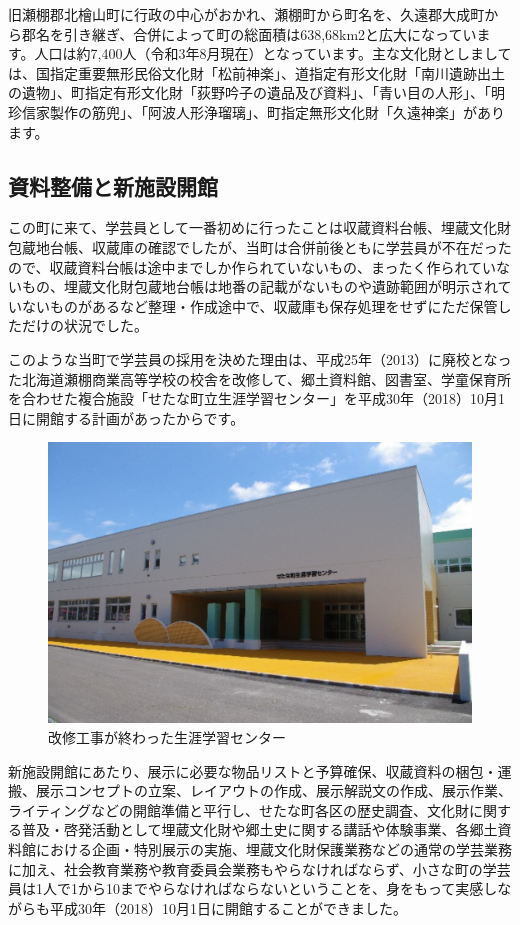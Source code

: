 \documentclass[a4j,11pt,twocolumn,openany]{jsbook}
\begin{document}
旧瀬棚郡北檜山町に行政の中心がおかれ、瀬棚町から町名を、久遠郡大成町から郡名を引き継ぎ、合併によって町の総面積は638,68km2と広大になっています。人口は約7,400人（令和3年8月現在）となっています。主な文化財としましては、国指定重要無形民俗文化財「松前神楽」、道指定有形文化財「南川遺跡出土の遺物」、町指定有形文化財「荻野吟子の遺品及び資料」、「青い目の人形」、「明珍信家製作の筋兜」、「阿波人形浄瑠璃」、町指定無形文化財「久遠神楽」があります。

\newpage
\subsection{資料整備と新施設開館}
この町に来て、学芸員として一番初めに行ったことは収蔵資料台帳、埋蔵文化財包蔵地台帳、収蔵庫の確認でしたが、当町は合併前後ともに学芸員が不在だったので、収蔵資料台帳は途中までしか作られていないもの、まったく作られていないもの、埋蔵文化財包蔵地台帳は地番の記載がないものや遺跡範囲が明示されていないものがあるなど整理・作成途中で、収蔵庫も保存処理をせずにただ保管しただけの状況でした。

このような当町で学芸員の採用を決めた理由は、平成25年（2013）に廃校となった北海道瀬棚商業高等学校の校舎を改修して、郷土資料館、図書室、学童保育所を合わせた複合施設「せたな町立生涯学習センター」を平成30年（2018）10月1日に開館する計画があったからです。

\begin{figure}[H]
	\centering
	\includegraphics[width=\linewidth]{fig/04_Kudo/fig02.png}
	\caption{改修工事が終わった生涯学習センター}
	\label{}
\end{figure}

新施設開館にあたり、展示に必要な物品リストと予算確保、収蔵資料の梱包・運搬、展示コンセプトの立案、レイアウトの作成、展示解説文の作成、展示作業、ライティングなどの開館準備と平行し、せたな町各区の歴史調査、文化財に関する普及・啓発活動として埋蔵文化財や郷土史に関する講話や体験事業、各郷土資料館における企画・特別展示の実施、埋蔵文化財保護業務などの通常の学芸業務に加え、社会教育業務や教育委員会業務もやらなければならず、小さな町の学芸員は1人で1から10までやらなければならないということを、身をもって実感しながらも平成30年（2018）10月1日に開館することができました。
\end{document}
